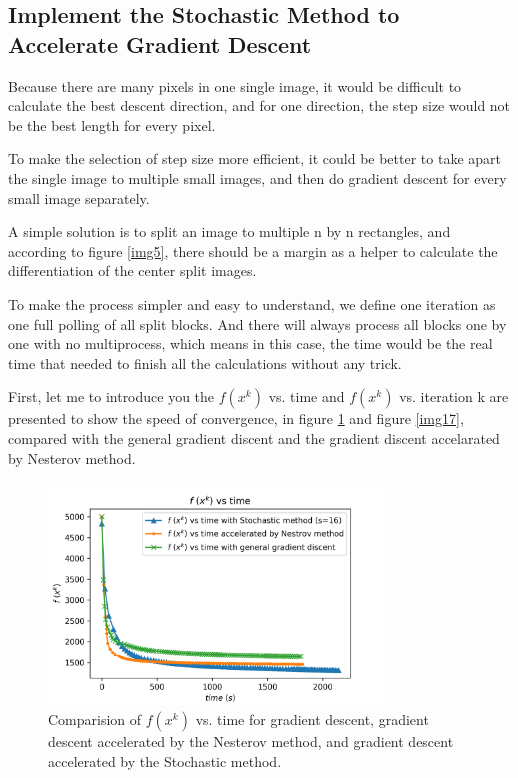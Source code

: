 \documentclass{article}
\begin{document}
\subsection{Implement the Stochastic Method to Accelerate Gradient Descent}

Because there are many pixels in one single image, it would be difficult to calculate the best descent direction, and for one direction, the step size would not be the best length for every pixel.

To make the selection of step size more efficient, it could be better to take apart the single image to multiple small images, and then do gradient descent for every small image separately.

A simple solution is to split an image to multiple n by n rectangles, and according to figure \ref{img5}, there should be a margin as a helper to calculate the differentiation of the center split images. 

To make the process simpler and easy to understand, we define one iteration as one full polling of all split blocks. And there will always process all blocks one by one with no multiprocess, which means in this case, the time would be the real time that needed to finish all the calculations without any trick.

First, let me to introduce you the $f(x^{k})$ vs. time and  $f(x^{k})$ vs. iteration k are presented to show the speed of convergence, in figure \ref{img16} and figure \ref{img17}, compared with the general gradient discent and the gradient discent accelarated by Nesterov method.

\begin{figure}[h]
  \includegraphics[width=3.5in]{pic16.png}
  \centering
  \caption{Comparision of $f(x^{k})$ vs. time for gradient descent, gradient descent accelerated by the Nesterov method, and gradient descent accelerated by the Stochastic method.}
  \label{img16}
\end{figure}
\end{document}
